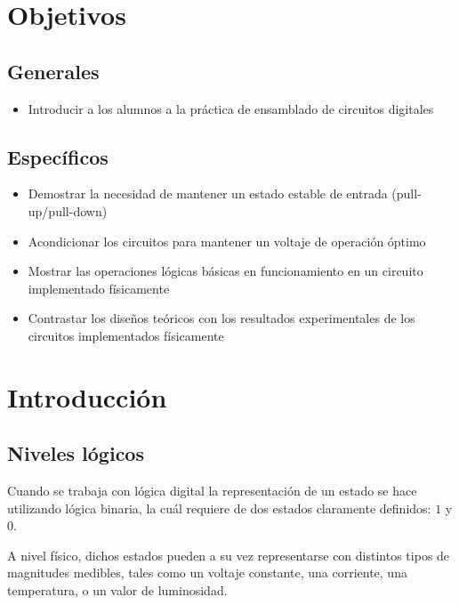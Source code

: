 
\section*{Objetivos}
\subsection*{Generales}
\begin{itemize}
    \item Introducir a los alumnos a la práctica de ensamblado de circuitos digitales
\end{itemize}

\subsection*{Específicos}
\begin{itemize}
    \item Demostrar la necesidad de mantener un estado estable de entrada (pull-up/pull-down)
    \item Acondicionar los circuitos para mantener un voltaje de operación óptimo
    \item Mostrar las operaciones lógicas básicas en funcionamiento en un circuito implementado físicamente
    \item Contrastar los diseños teóricos con los resultados experimentales de los circuitos implementados físicamente
\end{itemize}

\section{Introducción}
\subsection{Niveles lógicos}
\label{subsection:NivelesLogicos}
Cuando se trabaja con lógica digital la representación de un estado se hace utilizando lógica binaria, la cuál requiere
de dos estados claramente definidos: $1$ y $0$.

A nivel físico, dichos estados pueden a su vez representarse con distintos tipos de magnitudes medibles, tales como 
un voltaje constante, una corriente, una temperatura, o un valor de luminosidad.

